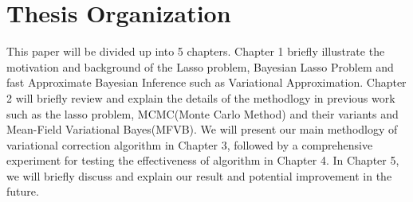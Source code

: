 \section{Thesis Organization}
This paper will be divided up into 5 chapters. Chapter 1 briefly illustrate the motivation and background of the Lasso problem, Bayesian Lasso Problem and fast Approximate Bayesian Inference such as Variational Approximation. Chapter 2 will briefly review and explain the details of the methodlogy in previous work such as the lasso problem, MCMC(Monte Carlo Method) and their variants and Mean-Field Variational Bayes(MFVB). We will present our main methodlogy of variational correction algorithm in Chapter 3, followed by a comprehensive experiment for testing the effectiveness of algorithm in Chapter 4. In Chapter 5, we will briefly discuss and explain our result and potential improvement in the future. 



 